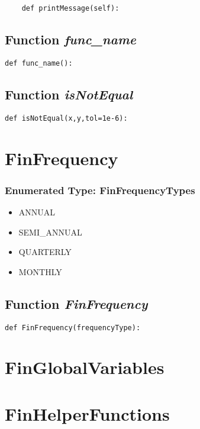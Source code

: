 \documentclass[twoside,11pt]{book}
\begin{document}
\begin{lstlisting}
    def printMessage(self):
\end{lstlisting}

\subsection{Function {\it func\_name}}


\begin{lstlisting}
def func_name():
\end{lstlisting}

\subsection{Function {\it isNotEqual}}


\begin{lstlisting}
def isNotEqual(x,y,tol=1e-6):
\end{lstlisting}

\newpage
\section{FinFrequency}

\subsubsection{Enumerated Type: FinFrequencyTypes}
\begin{itemize}
\item{ANNUAL}
\item{SEMI\_ANNUAL}
\item{QUARTERLY}
\item{MONTHLY}
\end{itemize}

\subsection{Function {\it FinFrequency}}


\begin{lstlisting}
def FinFrequency(frequencyType):
\end{lstlisting}

\newpage
\section{FinGlobalVariables}

\newpage
\section{FinHelperFunctions}
\end{document}
